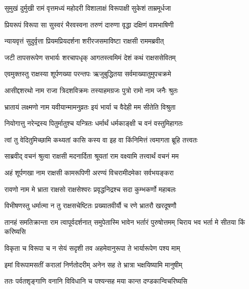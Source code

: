 \twolineshloka
{सुमुखं दुर्मुखी रामं वृत्तमध्यं महोदरी}
{विशालाक्षं विरूपाक्षी सुकेशं ताम्रमूर्धजा} %

\twolineshloka
{प्रियरूपं विरूपा सा सुस्वरं भैरवस्वना}
{तरुणं दारुणा वृद्धा दक्षिणं वामभाषिणी} %

\twolineshloka
{न्यायवृत्तं सुदुर्वृत्ता प्रियमप्रियदर्शना}
{शरीरजसमाविष्टा राक्षसी राममब्रवीत्} %

\twolineshloka
{जटी तापसरूपेण सभार्यः शरचापधृक्}
{आगतस्त्वमिमं देशं कथं राक्षससेवितम्} %

\twolineshloka
{एवमुक्तस्तु राक्षस्या शूर्पणख्या परन्तपः}
{ऋजुबुद्धितया सर्वमाख्यातुमुपचक्रमे} %

\twolineshloka
{आसीद्दशरथो नाम राजा त्रिदशविक्रमः}
{तस्याहमग्रजः पुत्रो रामो नाम जनैः श्रुतः} %

\twolineshloka
{भ्रातायं लक्ष्मणो नाम यवीयान्मामनुव्रतः}
{इयं भार्या च वैदेही मम सीतेति विश्रुता} %

\twolineshloka
{नियोगात्तु नरेन्द्रस्य पितुर्मातुश्च यन्त्रितः}
{धर्मार्थं धर्मकाङ्क्षी च वनं वस्तुमिहागतः} %

\twolineshloka
{त्वां तु वेदितुमिच्छामि कथ्यतां कासि कस्य वा}
{इह वा किंनिमित्तं त्वमागता ब्रूहि तत्त्वतः} %

\twolineshloka
{साब्रवीद् वचनं श्रुत्वा राक्षसी मदनार्दिता}
{श्रूयतां राम वक्ष्यामि तत्त्वार्थं वचनं मम} %

\twolineshloka
{अहं शूर्पणखा नाम राक्षसी कामरूपिणी}
{अरण्यं विचरामीदमेका सर्वभयङ्करा} %

\twolineshloka
{रावणो नाम मे भ्राता राक्षसो राक्षसेश्वरः}
{प्रवृद्धनिद्रश्च सदा कुम्भकर्णो महाबलः} %

\twolineshloka
{विभीषणस्तु धर्मात्मा न तु राक्षसचेष्टितः}
{प्रख्यातवीर्यौ च रणे भ्रातरौ खरदूषणौ} %

\threelineshloka
{तानहं समतिक्रान्ता राम त्वापूर्वदर्शनात्}
{समुपेतास्मि भावेन भर्तारं पुरुषोत्तमम्}
{चिराय भव भर्ता मे सीतया किं करिष्यसि} %

\twolineshloka
{विकृता च विरूपा च न सेयं सदृशी तव}
{अहमेवानुरूपा ते भार्यारूपेण पश्य माम्} %

\twolineshloka
{इमां विरूपामसतीं करालां निर्णतोदरीम्}
{अनेन सह ते भ्रात्रा भक्षयिष्यामि मानुषीम्} %

\twolineshloka
{ततः पर्वतशृङ्गाणि वनानि विविधानि च}
{पश्यन्सह मया कान्त दण्डकान्विचरिष्यसि} %

